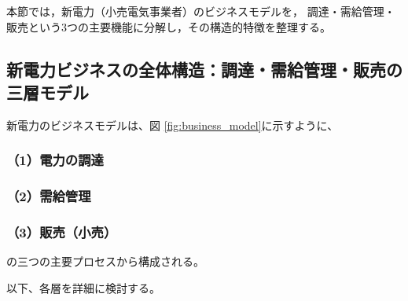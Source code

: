 本節では，新電力（小売電気事業者）のビジネスモデルを，
調達・需給管理・販売という3つの主要機能に分解し，その構造的特徴を整理する。


\subsection{新電力ビジネスの全体構造：調達・需給管理・販売の三層モデル}

新電力のビジネスモデルは、図 \ref{fig:business_model}に示すように、

\subsubsection*{\hspace{2em}（1）電力の調達}

\subsubsection*{\hspace{2em}（2）需給管理}

\subsubsection*{\hspace{2em}（3）販売（小売）}


の三つの主要プロセスから構成される。

以下、各層を詳細に検討する。



